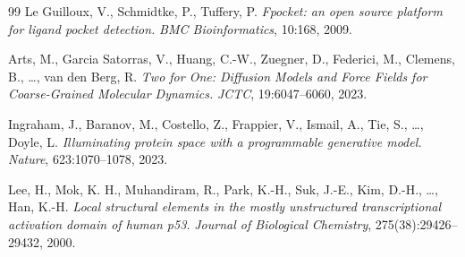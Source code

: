 \documentclass[12pt]{article}
\begin{document}
\begin{thebibliography}{99}
Le Guilloux, V., Schmidtke, P., Tuffery, P.
\textit{Fpocket: an open source platform for ligand pocket detection.}
\textit{BMC Bioinformatics}, 10:168, 2009.

Arts, M., Garcia Satorras, V., Huang, C.-W., Zuegner, D., Federici, M., Clemens, B., \ldots, van den Berg, R.
\textit{Two for One: Diffusion Models and Force Fields for Coarse-Grained Molecular Dynamics.}
\textit{JCTC}, 19:6047--6060, 2023.

Ingraham, J., Baranov, M., Costello, Z., Frappier, V., Ismail, A., Tie, S., \ldots, Doyle, L.
\textit{Illuminating protein space with a programmable generative model.}
\textit{Nature}, 623:1070--1078, 2023.

Lee, H., Mok, K. H., Muhandiram, R., Park, K.-H., Suk, J.-E., Kim, D.-H., \ldots, Han, K.-H.
\textit{Local structural elements in the mostly unstructured transcriptional activation domain of human p53.}
\textit{Journal of Biological Chemistry}, 275(38):29426--29432, 2000.

\end{thebibliography}
\end{document}
